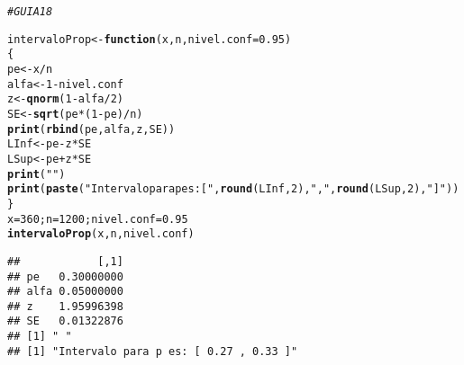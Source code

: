 \documentclass{article}\usepackage[]{graphicx}\usepackage[]{color}
\makeatletter
\newcommand{\hlnum}[1]{\textcolor[rgb]{0.686,0.059,0.569}{#1}}%
\newcommand{\hlstr}[1]{\textcolor[rgb]{0.192,0.494,0.8}{#1}}%
\newcommand{\hlcom}[1]{\textcolor[rgb]{0.678,0.584,0.686}{\textit{#1}}}%
\newcommand{\hlopt}[1]{\textcolor[rgb]{0,0,0}{#1}}%
\newcommand{\hlstd}[1]{\textcolor[rgb]{0.345,0.345,0.345}{#1}}%
\newcommand{\hlkwa}[1]{\textcolor[rgb]{0.161,0.373,0.58}{\textbf{#1}}}%
\newcommand{\hlkwb}[1]{\textcolor[rgb]{0.69,0.353,0.396}{#1}}%
\newcommand{\hlkwc}[1]{\textcolor[rgb]{0.333,0.667,0.333}{#1}}%
\newcommand{\hlkwd}[1]{\textcolor[rgb]{0.737,0.353,0.396}{\textbf{#1}}}%
\newenvironment{kframe}{%
 \def\at@end@of@kframe{}%
 \ifinner\ifhmode%
  \def\at@end@of@kframe{\end{minipage}}%
  \begin{minipage}{\columnwidth}%
 \fi\fi%
 \def\FrameCommand##1{\hskip\@totalleftmargin \hskip-\fboxsep
 \colorbox{shadecolor}{##1}\hskip-\fboxsep
     \hskip-\linewidth \hskip-\@totalleftmargin \hskip\columnwidth}%
 \MakeFramed {\advance\hsize-\width
   \@totalleftmargin\z@ \linewidth\hsize
   \@setminipage}}%
 {\par\unskip\endMakeFramed%
 \at@end@of@kframe}
\newenvironment{knitrout}{}{} %
\makeatother
\begin{document}
\begin{knitrout}
\color{fgcolor}\begin{kframe}
\begin{alltt}
\hlcom{# GUIA 18}

\hlstd{intervaloProp} \hlkwb{<-} \hlkwa{function}\hlstd{(}\hlkwc{x}\hlstd{,} \hlkwc{n}\hlstd{,} \hlkwc{nivel.conf}\hlstd{=}\hlnum{0.95}\hlstd{)}
\hlstd{\{}
\hlstd{pe} \hlkwb{<-} \hlstd{x}\hlopt{/}\hlstd{n}
\hlstd{alfa} \hlkwb{<-} \hlnum{1}\hlopt{-}\hlstd{nivel.conf}
\hlstd{z} \hlkwb{<-} \hlkwd{qnorm}\hlstd{(}\hlnum{1}\hlopt{-}\hlstd{alfa}\hlopt{/}\hlnum{2}\hlstd{)}
\hlstd{SE} \hlkwb{<-} \hlkwd{sqrt}\hlstd{(pe}\hlopt{*}\hlstd{(}\hlnum{1}\hlopt{-}\hlstd{pe)}\hlopt{/}\hlstd{n)}
\hlkwd{print}\hlstd{(}\hlkwd{rbind}\hlstd{(pe, alfa, z, SE))}
\hlstd{LInf} \hlkwb{<-} \hlstd{pe}\hlopt{-}\hlstd{z}\hlopt{*}\hlstd{SE}
\hlstd{LSup} \hlkwb{<-} \hlstd{pe}\hlopt{+}\hlstd{z}\hlopt{*}\hlstd{SE}
\hlkwd{print}\hlstd{(}\hlstr{" "}\hlstd{)}
\hlkwd{print}\hlstd{(}\hlkwd{paste}\hlstd{(}\hlstr{"Intervalo para p es: ["}\hlstd{,} \hlkwd{round}\hlstd{(LInf,} \hlnum{2}\hlstd{),} \hlstr{","}\hlstd{,} \hlkwd{round}\hlstd{(LSup,} \hlnum{2}\hlstd{),} \hlstr{"]"}\hlstd{))}
\hlstd{\}}
\hlstd{x}\hlkwb{=}\hlnum{360}\hlstd{; n}\hlkwb{=}\hlnum{1200}\hlstd{; nivel.conf}\hlkwb{=}\hlnum{0.95}
\hlkwd{intervaloProp}\hlstd{(x, n, nivel.conf)}
\end{alltt}
\begin{verbatim}
##            [,1]
## pe   0.30000000
## alfa 0.05000000
## z    1.95996398
## SE   0.01322876
## [1] " "
## [1] "Intervalo para p es: [ 0.27 , 0.33 ]"
\end{verbatim}
\end{kframe}
\end{knitrout}
\end{document}
